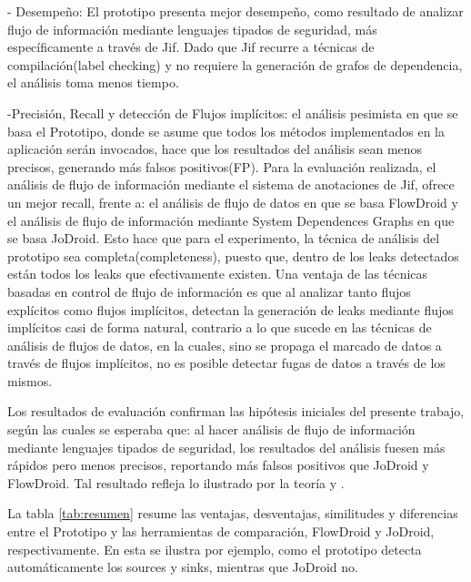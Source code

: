 - Desempeño:\newline 
El prototipo presenta mejor desempeño, como resultado de analizar flujo de
información mediante lenguajes tipados de seguridad, más específicamente a
través de Jif. Dado que Jif recurre a técnicas de compilación(label checking) y
no requiere la generación de grafos de dependencia, el análisis toma menos
tiempo.

-Precisión, Recall y detección de Flujos implícitos:\newline 
el análisis pesimista en que se basa el Prototipo, donde se asume que todos los
métodos implementados en la aplicación serán invocados, hace que los resultados
del análisis sean menos precisos, generando más falsos positivos(FP). 
Para la evaluación realizada, el análisis de flujo de información mediante el
sistema de anotaciones de Jif, ofrece un mejor recall, frente a: el análisis de
flujo de datos en que se basa FlowDroid y el análisis de flujo de información
mediante System Dependences Graphs  en que se basa JoDroid. Esto hace que para
el experimento, la técnica de análisis del prototipo sea completa(completeness),
puesto que, dentro de los leaks detectados están todos los leaks que
efectivamente existen.\newline
Una ventaja de las técnicas basadas en control de flujo de información es que al
analizar tanto flujos explícitos como flujos implícitos, detectan la generación
de leaks mediante flujos implícitos casi de forma natural, contrario a lo que
sucede en las técnicas de análisis de flujos de datos, en la cuales, sino se
propaga el marcado de datos a través de flujos implícitos, no es posible
detectar fugas de datos a través de los mismos.

Los resultados de evaluación confirman las hipótesis iniciales del presente
trabajo, según las cuales se esperaba que: al hacer análisis de flujo de
información mediante lenguajes tipados de seguridad, los resultados del análisis
fuesen más rápidos pero menos precisos, reportando más falsos positivos que
JoDroid y FlowDroid.\newline
Tal resultado refleja lo ilustrado por la teoría \cite{taghdiri-etal-2010} y
\cite{hammer09ijis}.\newline

La tabla \ref{tab:resumen} resume 
las ventajas, desventajas, similitudes y
diferencias entre el Prototipo y las herramientas de comparación, FlowDroid y
JoDroid, respectivamente. En esta se ilustra por ejemplo, como el prototipo
detecta automáticamente los sources y sinks, mientras que JoDroid no.

